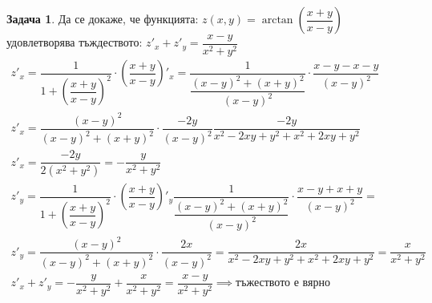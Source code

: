 \documentclass[a4paper,fleqn,12pt]{article}
\theoremstyle{definition}
\newtheorem{task}{Задача}[subsection]
\begin{document}
\begin{task}
Да се докаже, че функцията: $z(x,y) = \arctan{\left( \dfrac{x+y}{x-y} \right)}$ удовлетворява тъждеството: $z'_x + z'_y = \dfrac{x-y}{x^2 + y^2}$
\begin{gather*}
z'_x = \dfrac{1}{1 + \left( \dfrac{x+y}{x-y} \right)^2} \cdot \left( \dfrac{x+y}{x-y} \right)'_x =  \dfrac{1}{\dfrac{(x-y)^2 + (x+y)^2}{(x-y)^2}} \cdot \dfrac{x-y-x-y}{(x-y)^2} \\
z'_x = \dfrac{(x-y)^2}{(x-y)^2 + (x+y)^2} \cdot \dfrac{-2y}{(x-y)^2}\dfrac{-2y}{x^2 -2xy+y^2 + x^2+2xy+y^2} \\
z'_x = \dfrac{-2y}{2(x^2+y^2)} =  -\dfrac{y}{x^2+y^2} \\
z'_y = \dfrac{1}{1 + \left( \dfrac{x+y}{x-y} \right)^2} \cdot \left( \dfrac{x+y}{x-y} \right)'_y  \dfrac{1}{\dfrac{(x-y)^2 + (x+y)^2}{(x-y)^2}} \cdot \dfrac{x-y+x+y}{(x-y)^2} = \\
z'_y = \dfrac{(x-y)^2}{(x-y)^2 + (x+y)^2} \cdot \dfrac{2x}{(x-y)^2} = \dfrac{2x}{x^2 -2xy+y^2 + x^2+2xy+y^2} = \dfrac{x}{x^2+y^2}\\
z'_x + z'_y = -\dfrac{y}{x^2+y^2} + \dfrac{x}{x^2+y^2} = \dfrac{x-y}{x^2+y^2} \implies \text{тъжеството е вярно}
\end{gather*}
\end{task}
\end{document}
